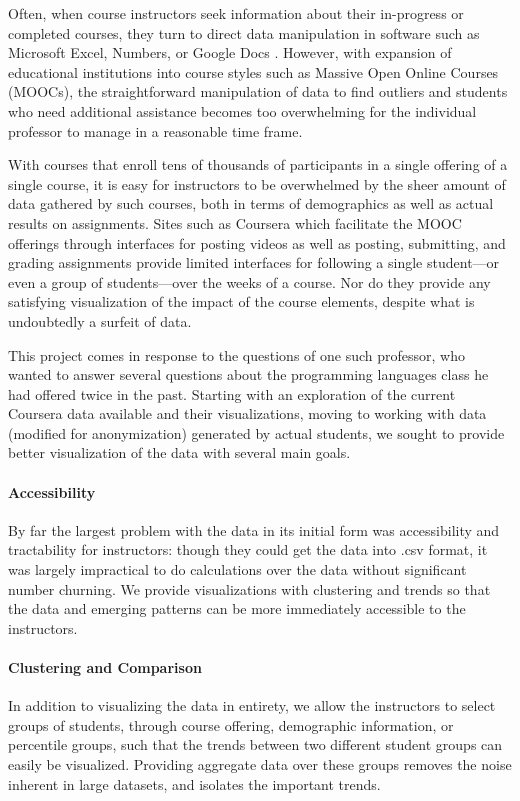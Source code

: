 Often, when course instructors seek information about their in-progress or completed courses, they 
turn to direct data manipulation in software such as Microsoft Excel, Numbers, or Google Docs \cite{ excel, numbers, docs}. 
However, with expansion of educational institutions into course styles such as Massive Open Online 
Courses (MOOCs), the straightforward manipulation of data to find outliers and students who need 
additional assistance becomes too overwhelming for the individual professor to manage in a 
reasonable time frame. 

With courses that enroll tens of thousands of participants in a single offering of a single 
course, it is easy for instructors to be overwhelmed by the sheer amount of data gathered by such 
courses, both in terms of demographics as well as actual results on assignments. Sites such as 
Coursera \cite{coursers} which facilitate the MOOC offerings through interfaces for posting videos as
well as posting, submitting, and grading assignments provide limited interfaces for following a single student---or even a group of students---over the weeks of a course. Nor do they provide any satisfying visualization of the impact of the course elements, despite what is undoubtedly a surfeit of data. 

This project comes in response to the questions of one such professor, who wanted to answer several questions about the programming languages class he had offered twice in the past. Starting with an exploration of the current Coursera data available and their visualizations, moving to working with data (modified for anonymization) generated by actual students, we sought to provide better visualization of the data with several main goals. 

\paragraph{Accessibility}
By far the largest problem with the data in its initial form was accessibility and tractability for 
instructors: though they could get the data into .csv format, it was largely impractical to do calculations
over the data without significant number churning. We provide visualizations with clustering and 
trends so that the data and emerging patterns can be more immediately accessible to the instructors.

\paragraph{Clustering and Comparison}
In addition to visualizing the data in entirety, we allow the instructors to select groups of students, 
through course offering, demographic information, or percentile groups, such that the trends between 
two different student groups can easily be visualized. Providing aggregate data over these groups removes the noise inherent in large datasets, and isolates the important trends. 

